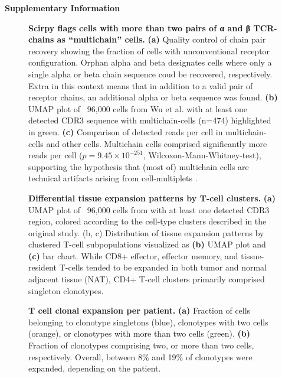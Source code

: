 \documentclass{article}
\begin{document}
\begin{center}
    \normalfont\Large\bfseries{Supplementary Information}
\end{center}
\vspace*{60pt}

\begin{figure}[!hb]
  \centering
  
  \caption{\textbf{Scirpy flags cells with more than two pairs of α and β TCR-chains as “multichain” cells.} \textbf{(a)} Quality control of chain pair recovery showing the fraction of cells with unconventional receptor configuration. Orphan alpha and beta designates cells where only a single alpha or beta chain sequence coud be recovered, respectively. Extra in this context means that in addition to a valid pair of receptor chains, an additional alpha or beta sequence was found. \textbf{(b)} UMAP plot of ~96,000 cells from Wu et al. \cite{Wu2020-vp} with at least one detected CDR3 sequence with multichain-cells (n=474) highlighted in green. \textbf{(c)} Comparison of detected reads per cell in multichain-cells and other cells. Multichain cells comprised significantly more reads per cell ($p=9.45 \times 10^{-251}$, Wilcoxon-Mann-Whitney-test), supporting the hypothesis that (most of) multichain cells are technical artifacts arising from cell-multiplets \cite{Ilicic2016-ny}. }
\end{figure}

\newpage
\begin{figure}[!ht]
  \centering
  
  \caption{\textbf{Differential tissue expansion patterns by T-cell clusters.} \textbf{(a)} UMAP plot of ~96,000 cells from \cite{Wu2020-vp} with at least one detected CDR3 region, colored according to the cell-type clusters described in the original study. (b, c) Distribution of tissue expansion patterns by clustered T-cell subpopulations visualized as \textbf{(b)} UMAP plot and \textbf{(c)} bar chart. While CD8+ effector, effector memory, and tissue-resident T-cells tended to be expanded in both tumor and normal adjacent tissue (NAT), CD4+ T-cell clusters primarily comprised singleton clonotypes.}
\end{figure}

\newpage
\begin{figure}[!ht]
  \centering
  
  \caption{\textbf{T cell clonal expansion per patient.} \textbf{(a)} Fraction of cells belonging to clonotype singletons (blue), clonotypes with two cells (orange), or clonotypes with more than two cells (green). \textbf{(b)} Fraction of clonotypes comprising two, or more than two cells, respectively. Overall, between 8\% and 19\% of clonotypes were expanded, depending on the patient.}
\end{figure}
\end{document}
